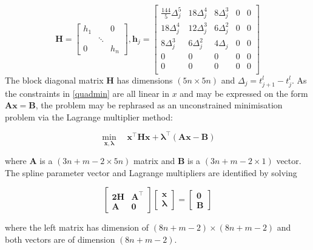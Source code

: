 \begin{equation*}
\textbf{H} =
 \begin{bmatrix}
  h_1 & & 0 \\
  & \ddots & \\
  0 &  & h_n
 \end{bmatrix},
\textbf{h}_j =
 \begin{bmatrix}
  \frac{144}{5}\Delta^5_j & 18\Delta^4_j & 8\Delta^3_j & 0 & 0 \\
  18\Delta^4_j & 12\Delta^3_j & 6\Delta^2_j & 0 & 0 \\
  8\Delta^3_j & 6\Delta^2_j & 4\Delta_j & 0 & 0 \\
  0 & 0 & 0 & 0 & 0\\
  0 & 0 & 0 & 0 & 0\\
 \end{bmatrix}
\end{equation*}
The block diagonal matrix $\textbf{H}$ has dimensions $(5n\times5n)$ and $\Delta_j = t^l_{j+1}-t^l_{j}$. As the constraints in \eqref{quadmin} are all linear in $x$ and may be expressed on the form $\boldsymbol{Ax}=\boldsymbol{B}$, the problem may be rephrased as an unconstrained minimisation problem via the Lagrange multiplier method:

\begin{equation*}
\min_{\mathbf{x},\boldsymbol{\lambda}}  \quad  \boldsymbol{x^\intercal Hx + \lambda^\intercal(Ax-B)}
\end{equation*}

\noindent where $\mathbf{A}$ is a $(3n+m -2 \times 5n)$ matrix and $\mathbf{B}$ is a $(3n+m-2 \times 1)$ vector. The spline parameter vector and Lagrange multipliers are identified by solving

\begin{equation}
 \begin{bmatrix}
  \mathbf{2H} & \mathbf{A^\intercal} \\
  \mathbf{A}  & \mathbf{0}
 \end{bmatrix}
  \begin{bmatrix}
  \mathbf{x} \\
  \boldsymbol{\lambda}
 \end{bmatrix}
 =
 \begin{bmatrix}
  \mathbf{0} \\
  \mathbf{B}  
 \end{bmatrix}
\end{equation}

\noindent where the left matrix has dimension of $(8n+m-2) \times (8n+m-2)$ and both vectors are of dimension $(8n+m-2)$. %

